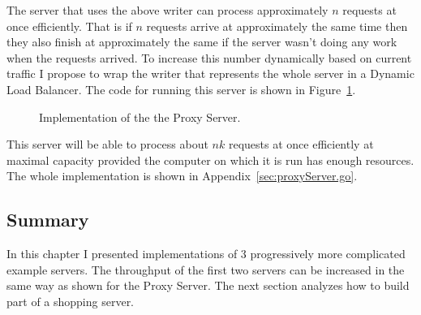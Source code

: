 \newpage
The server that uses the above writer can process approximately $n$ requests
at once efficiently. That is if $n$ requests arrive at approximately the same
time then they also finish at approximately the same if the server wasn't
doing any work when the requests arrived.
To increase this number dynamically based on current traffic I propose
to wrap the writer that represents the whole server in a Dynamic Load
Balancer. The code for running this server is shown in 
Figure~\ref{fig:ProxyServerImpl}.
\begin{figure}[h]
 
\caption[scale=1.0]{Implementation of the the Proxy Server.}
\label{fig:ProxyServerImpl}
\end{figure}

This server will be able to process about $n k$ requests at once efficiently
at maximal capacity provided the computer on which it is run has enough resources.
The whole implementation is shown in Appendix~\ref{sec:proxyServer.go}.

\subsection{Summary}
In this chapter I presented implementations of 3 progressively more 
complicated example servers. The throughput of the first two servers
can be increased in the same way as shown for the Proxy Server. The 
next section analyzes how to build part of a shopping server.
